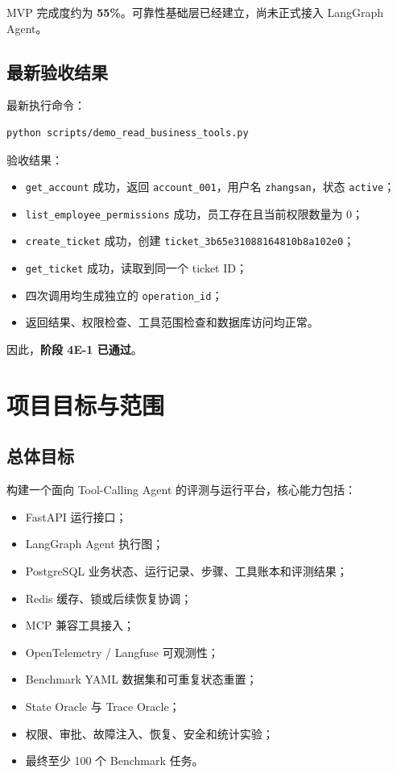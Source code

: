 \documentclass[11pt,a4paper]{ctexart}
\begin{document}
MVP 完成度约为 \textbf{55\%}。可靠性基础层已经建立，尚未正式接入 LangGraph Agent。

\subsection{最新验收结果}

最新执行命令：

\begin{lstlisting}[language=bash]
python scripts/demo_read_business_tools.py
\end{lstlisting}

验收结果：

\begin{itemize}[leftmargin=2em]
  \item \texttt{get\_account} 成功，返回 \texttt{account\_001}，用户名
        \texttt{zhangsan}，状态 \texttt{active}；
  \item \texttt{list\_employee\_permissions} 成功，员工存在且当前权限数量为 0；
  \item \texttt{create\_ticket} 成功，创建
        \texttt{ticket\_3b65e31088164810b8a102e0}；
  \item \texttt{get\_ticket} 成功，读取到同一个 ticket ID；
  \item 四次调用均生成独立的 \texttt{operation\_id}；
  \item 返回结果、权限检查、工具范围检查和数据库访问均正常。
\end{itemize}

因此，\textbf{阶段 4E-1 已通过}。

\section{项目目标与范围}

\subsection{总体目标}

构建一个面向 Tool-Calling Agent 的评测与运行平台，核心能力包括：

\begin{itemize}[leftmargin=2em]
  \item FastAPI 运行接口；
  \item LangGraph Agent 执行图；
  \item PostgreSQL 业务状态、运行记录、步骤、工具账本和评测结果；
  \item Redis 缓存、锁或后续恢复协调；
  \item MCP 兼容工具接入；
  \item OpenTelemetry / Langfuse 可观测性；
  \item Benchmark YAML 数据集和可重复状态重置；
  \item State Oracle 与 Trace Oracle；
  \item 权限、审批、故障注入、恢复、安全和统计实验；
  \item 最终至少 100 个 Benchmark 任务。
\end{itemize}
\end{document}
